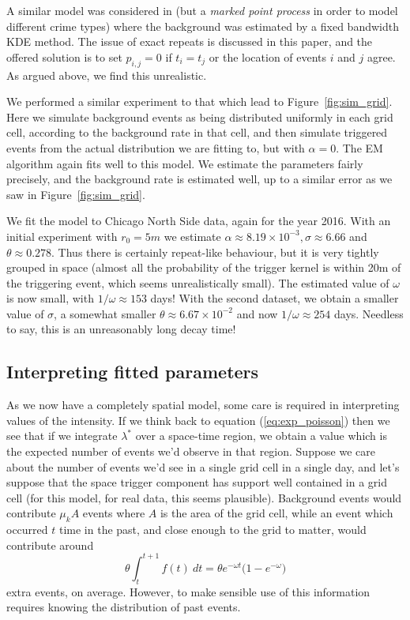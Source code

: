 \documentclass[twoside,a4paper]{article}
\theoremstyle{plain}
\theoremstyle{definition}
\begin{document}
A similar model was considered in \cite{mohler} (but a \emph{marked point process} in order
to model different crime types) where the background was estimated by a fixed bandwidth KDE
method.  The issue of exact repeats is discussed in this paper, and the offered solution is
to set $p_{i,j}=0$ if $t_i=t_j$ or the location of events $i$ and $j$ agree.  As argued above,
we find this unrealistic.

We performed a similar experiment to that which lead to Figure~\ref{fig:sim_grid}.  Here we
simulate background events as being distributed uniformly in each grid cell, according to
the background rate in that cell, and then simulate triggered events from the actual distribution
we are fitting to, but with $\alpha=0$.  The EM algorithm again fits well to this model.
We estimate the parameters fairly precisely, and the background rate is estimated well,
up to a similar error as we saw in Figure~\ref{fig:sim_grid}.

We fit the model to Chicago North Side data, again for the year 2016.  With an initial
experiment with $r_0=5m$ we estimate $\alpha\approx 8.19\times 10^{-3}, \sigma \approx 6.66$
and $\theta\approx 0.278$.  Thus there is certainly repeat-like behaviour, but it is very
tightly grouped in space (almost all the probability of the trigger kernel is within
20m of the triggering event, which seems unrealistically small).  The estimated value of
$\omega$ is now small, with $1/\omega \approx 153$ days!  With the second dataset, we obtain
a smaller value of $\sigma$, a somewhat smaller $\theta \approx 6.67\times 10^{-2}$ and
now $1/\omega\approx 254$ days.  Needless to say, this is an unreasonably long decay time!




\subsection{Interpreting fitted parameters}\label{sec:int_fit_params}

As we now have a completely spatial model, some care is required in interpreting values of
the intensity.  If we think back to equation (\ref{eq:exp_poisson}) then we see that if
we integrate $\lambda^*$ over a space-time region, we obtain a value which is the expected
number of events we'd observe in that region.  Suppose we care about the number of events
we'd see in a single grid cell in a single day, and let's suppose that the space trigger
component has support well contained in a grid cell (for this model, for real data, this
seems plausible).  Background events would contribute $\mu_k A$ events where $A$ is the
area of the grid cell, while an event which occurred $t$ time in the past, and close enough
to the grid to matter, would contribute around
\[ \theta \int_{t}^{t+1} f(t) \ dt = \theta e^{-\omega t} \big( 1 - e^{-\omega} \big) \]
extra events, on average.  However, to make sensible use of this information requires knowing
the distribution of past events.
\end{document}
